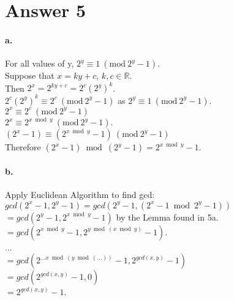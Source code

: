\documentclass[11pt]{article}
\newcommand{\Mod}[1]{\ (\mathrm{mod}\ #1)}
\begin{document}
\section*{Answer 5}
\paragraph{a.}
    For all values of y,  $2^y \equiv 1\Mod{2^y-1}$.\\
    Suppose that $x=ky+c$, $k,c \in \mathbb{R}$.\\
    Then $2^x = 2^{ky+c} = 2^c(2^y)^k$.\\
    $2^c(2^y)^k \equiv 2^c \Mod{2^y-1}$ as $2^y \equiv 1\Mod{2^y-1}$.\\
    $2^x \equiv 2^c\Mod{2^y-1}$\\
    $2^x \equiv 2^{x \bmod y}\Mod{2^y-1}.$\\
    $(2^x -1) \equiv (2^{x \bmod y}-1) \Mod{2^y-1}$ \\
    Therefore $(2^x -1) \bmod (2^y-1) = 2^{x \bmod y}-1$.
    
    
\paragraph{b.}
    Apply Euclidean Algorithm to find gcd:\\
    $gcd(2^x-1,2^y-1) = gcd(2^y-1, (2^x-1 \bmod 2^y-1))$\\
    $= gcd(2^y-1, 2^{x \bmod y}-1)$ by the Lemma found in 5a. \\
    $= gcd(2^{x \bmod y}-1, 2^{y \bmod (x \bmod y)}-1)$.\\
    ...\\
    $= gcd(2^{...x\bmod (y \bmod(...))}-1,2^{gcd(x,y)}-1)$\\
    $= gcd(2^{gcd(x,y)}-1,0) $\\
    $= 2^{gcd(x,y)}-1$.
\end{document}
